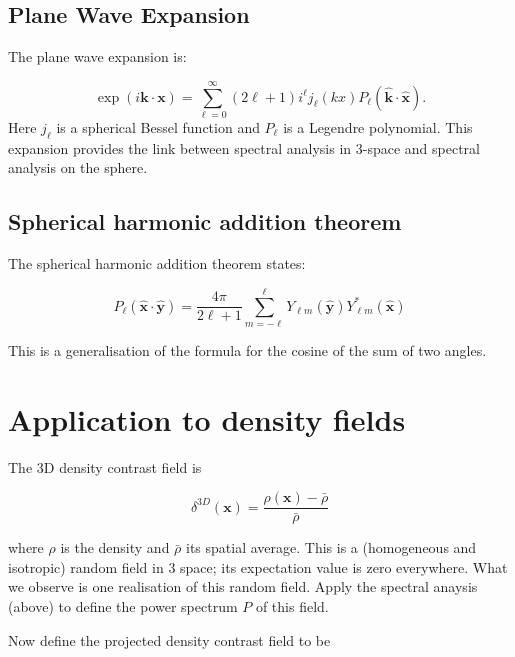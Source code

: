 \documentclass[11pt]{article}
\begin{document}
\subsection{Plane Wave Expansion}

The plane wave expansion is:

\begin{equation}
\exp(i \boldsymbol{k} \cdot \boldsymbol{x}) = \sum_{\ell=0}^\infty (2 \ell +1) i^{\ell} j_{\ell}(kx) P_{\ell}(\boldsymbol{\hat{k}} \cdot \boldsymbol{\hat{x}}).
\end{equation}
Here $j_{\ell}$ is a spherical Bessel function and $P_{\ell}$ is a Legendre polynomial. This expansion provides the link between spectral analysis in 3-space and spectral analysis on the sphere.

\subsection{Spherical harmonic addition theorem}

The spherical harmonic addition theorem states:

\begin{equation}
P_{\ell}(\boldsymbol{\hat{x}} \cdot \boldsymbol{\hat{y}}) = \frac{4 \pi}{2 \ell + 1}\sum_{m=-\ell}^{\ell} Y_{\ell m}(\boldsymbol{\hat{y}}) Y_{\ell m}^{\ast}(\boldsymbol{\hat{x}})
\end{equation}

\noindent This is a generalisation of the formula for the cosine of the sum of two angles.

\section{Application to density fields}

The 3D density contrast field is

\begin{equation}
\delta^{3D}(\boldsymbol{x}) = \frac{\rho(\boldsymbol{x}) - \bar{\rho}}{\bar{\rho}}
\end{equation}

\noindent where $\rho$ is the density and $\bar{\rho}$ its spatial average. This is a (homogeneous and isotropic) random field in 3 space; its expectation value is zero everywhere. What we observe is one realisation of this random field. Apply the spectral anaysis (above) to define the power spectrum $P$ of this field.

Now define the projected density contrast field to be
\end{document}

